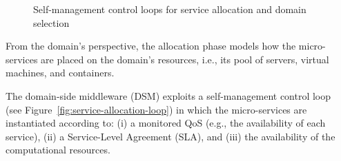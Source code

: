 \begin{figure}[thbp]
	\centering
	\captionsetup[subfigure]{width=0.4\textwidth}	
	\null\hfill
	\captionsetup[subfigure]{width=0.4\textwidth}	
	\hfill
	\hfill\null
	\caption{Self-management control loops for service allocation and domain selection}\label{fig:allocation-loops}
\end{figure}

From the domain's perspective, the allocation phase models how the micro-services are placed on the domain's resources, i.e., its pool of servers, virtual machines, and containers.



The domain-side middleware (DSM) exploits a self-management control loop~\cite{kephart2003vision} (see Figure~\ref{fig:service-allocation-loop}) in which the micro-services are instantiated according to: (i) a monitored QoS (e.g., the availability of each service), (ii) a Service-Level Agreement (SLA), and (iii) the availability of the computational resources. 

